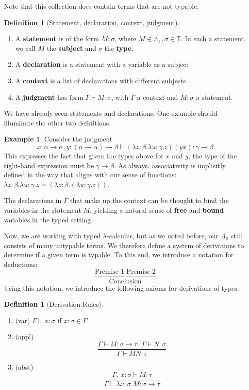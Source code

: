 \documentclass{article}
\theoremstyle{definition}
\newtheorem{definition} [theorem] {Definition}
\newtheorem{example}[theorem]{Example}
\newcommand{\T}{\mathbb{T}}
\newcommand{\1}{\mathbb{1}}
\newcommand{\0}{\mathbb{0}}
\begin{document}
Note that this collection does contain terms that are not typable. 

\begin{definition}[Statement, declaration, context, judgment]\,
\begin{enumerate}
    \item A \textbf{statement} is of the form $M : \sigma$, where $M \in \Lambda_\T, \sigma \in \T$. In such a statement, we call $M$ the \textbf{subject} and $\sigma$ the \textbf{type}.
    \item A \textbf{declaration} is a statement with a variable as a subject
    \item A \textbf{context} is a list of declarations with different subjects
    \item A \textbf{judgment} has form $\Gamma \vdash M : \sigma$, with $\Gamma$ a context and $M : \sigma$ a statement.
\end{enumerate}
\end{definition}

We have already seen statements and declarations. One example should illuminate the other two definitions.

\begin{example}
Consider the judgment
    \[x : \alpha \to \alpha, y : (\alpha \to \alpha) \to \beta \vdash (\lambda z : \beta . \lambda u : \gamma. z)(y x) : \gamma \to \beta.\]
This expresses the fact that given the types above for $x$ and $y$, the type of the right-hand expression must be $\gamma \to \beta$. As always, associativity is implicitly defined in the way that aligns with our sense of functions: $\lambda z : \beta . \lambda u : \gamma. z = (\lambda z : \beta . (\lambda u : \gamma. z))$. 
\end{example}

The declarations in $\Gamma$ that make up the context can be thought to bind the variables in the statement $M$, yielding a natural sense of \textbf{free} and \textbf{bound} variables in the typed setting. 

Now, we are working with typed $\lambda$-calculus, but as we noted before, our $\Lambda_\T$ still consists of many untypable terms. We therefore define a system of derivations to determine if a given term is typable. To this end, we introduce a notation for deductions:
\[\frac{\text{Premise 1    Premise 2}}{\text{Conclusion}}.\]
Using this notation, we introduce the following axioms for derivations of types:

\begin{definition}[Derivation Rules]\,
\begin{enumerate}
    \item (var) $\Gamma \vdash x : \sigma$ if $x : \sigma \in \Gamma$ 
    \item (appl) \[\frac{\Gamma \vdash M : \sigma \to \tau\,\,\,\,\Gamma \vdash N : \sigma}{\Gamma \vdash MN : \tau}\]
    \item (abst) \[\frac{\Gamma,\,x : \sigma \vdash M : \tau}{\Gamma \vdash \lambda x : \sigma. M : \sigma \to \tau}\]
\end{enumerate}
\end{definition}
\end{document}
